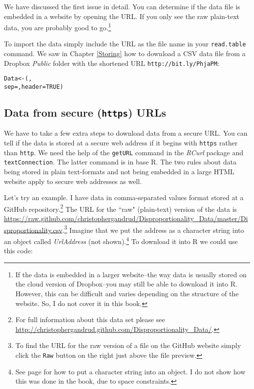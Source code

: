 We have discussed the first issue in detail. You can determine if the data file is embedded in a website by opening the URL. If you only see the raw plain-text data, you are probably good to go.\footnote{If the data is embedded in a larger website--the way data is usually stored on the cloud version of Dropbox--you may still be able to download it into R. However, this can be difficult and varies depending on the structure of the website. So, I do not cover it in this book.}

To import the data simply include the URL as the file name in your \texttt{read.table} command. We saw in Chapter \ref{Storing} how to download a CSV data file from a Dropbox \emph{Public} folder with the shortened URL \texttt{http://bit.ly/PhjaPM}:

\begin{knitrout}
\color{fgcolor}\begin{kframe}
\begin{alltt}
Data <- (, 
                   sep = , header = TRUE)
\end{alltt}
\end{kframe}
\end{knitrout}


\subsection{Data from secure ({\tt{https}}) URLs}\label{SecureDataDownload}

\noindent We have to take a few extra steps to download data from a secure URL. You can tell if the data is stored at a secure web address if it begins with \texttt{https} rather than \texttt{http}. We need the help of the \texttt{getURL} command in the {\emph{RCurl}} package \cite[]{R-RCurl} and \texttt{textConnection}. The latter command is in base R. The two rules about data being stored in plain text-formats and not being embedded in a large HTML website apply to secure web addresses as well.

Let's try an example. I have data in comma-separated values format stored at a GitHub repository.\footnote{For full information about this data set please see \url{http://christophergandrud.github.com/Disproportionality_Data/}.} The URL for the ``raw" (plain-text) version of the data is \url{https://raw.github.com/christophergandrud/Disproportionality_Data/master/Disproportionality.csv}.\footnote{To find the URL for the raw version of a file on the GitHub website simply click the \texttt{Raw} button on the right just above the file preview.} Imagine that we put the address as a character string into an object called \emph{UrlAddress} (not shown).\footnote{See page \pageref{Objects} for how to put a character string into an object. I do not show how this was done in the book, due to space constraints.} To download it into R we could use this code:




